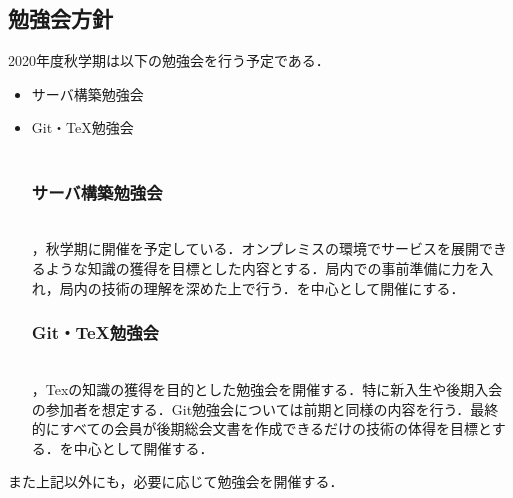 \subsection*{勉強会方針}


2020年度秋学期は以下の勉強会を行う予定である．
\begin{itemize}
    \item サーバ構築勉強会
\item Git・TeX勉強会
\\\\
    \subsubsection*{サーバ構築勉強会}\\
    ，秋学期に開催を予定している．オンプレミスの環境でサービスを展開できるような知識の獲得を目標とした内容とする．局内での事前準備に力を入れ，局内の技術の理解を深めた上で行う．\secondGrade{}を中心として開催にする．
\subsubsection*{Git・TeX勉強会}\\
    ，Texの知識の獲得を目的とした勉強会を開催する．特に新入生や後期入会の参加者を想定する．Git勉強会については前期と同様の内容を行う．最終的にすべての会員が後期総会文書を作成できるだけの技術の体得を目標とする．\secondgrade{}を中心として開催する．
\end{itemize}
また上記以外にも，必要に応じて勉強会を開催する．

